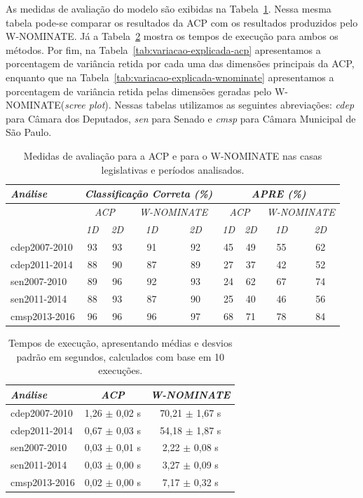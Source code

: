 \documentclass[
	article,			%
	12pt,				%
    twoside,			%
	a4paper,			%
	english,			%
	french,				%
	spanish,			%
	brazil,				%
	]{abntex2}
\newcommand\wnominate{W-NOMINATE\xspace}
\begin{document}
As medidas de avaliação do modelo são exibidas na Tabela~\ref{tab:fit}. Nessa mesma tabela pode-se comparar os resultados da ACP com os resultados produzidos pelo \wnominate. Já a Tabela~\ref{tab:tempos} mostra os tempos de execução para ambos os métodos. Por fim, na Tabela~\ref{tab:variacao-explicada-acp} apresentamos a porcentagem de variância retida por cada uma das dimensões principais da ACP, enquanto que na Tabela~\ref{tab:variacao-explicada-wnominate} apresentamos a porcentagem de variância retida pelas dimensões geradas pelo \wnominate (\emph{scree plot}). Nessas tabelas utilizamos as seguintes abreviações: \emph{cdep} para Câmara dos Deputados, \emph{sen} para Senado e \emph{cmsp} para Câmara Municipal de São Paulo.

\begin{table}
\centering
\begin{tabular}{l | c c | c c | c c | c c} 
\itshape Análise & \multicolumn{4}{c|}{\itshape Classificação Correta (\%)} & \multicolumn{4}{|c}{\itshape APRE (\%)} \\ 
\hline 
& \multicolumn{2}{c|}{\itshape ACP} & \multicolumn{2}{|c|}{\itshape \wnominate} & \multicolumn{2}{|c|}{\itshape ACP} & \multicolumn{2}{c}{\itshape \wnominate} \\ 
\hline 
& \itshape 1D & \itshape 2D & \itshape 1D & \itshape 2D & \itshape 1D & \itshape 2D & \itshape 1D & \itshape 2D \\ 
\hline 
cdep2007-2010 & 93 & 93 & 91 & 92 & 45 & 49 & 55 & 62 \\ 
cdep2011-2014 & 88 & 90 & 87 & 89 & 27 & 37 & 42 & 52 \\ 
sen2007-2010  & 89 & 96 & 92 & 93 & 24 & 62 & 67 & 74 \\ 
sen2011-2014  & 88 & 93 & 87 & 90 & 25 & 40 & 46 & 56 \\ 
cmsp2013-2016 & 96 & 96 & 96 & 97 & 68 & 71 & 78 & 84 \\ 
\end{tabular} 
\caption{Medidas de avaliação para a ACP e para o \wnominate nas casas legislativas e períodos analisados.}
\label{tab:fit}
\end{table}

\begin{table}
\centering
\begin{tabular}{l c c}
\itshape Análise & \itshape ACP & \itshape \wnominate \\
\hline
cdep2007-2010 & 1,26 $\pm$ 0,02 s & 70,21 $\pm$ 1,67 s \\ 
cdep2011-2014 & 0,67 $\pm$ 0,03 s & 54,18 $\pm$ 1,87 s \\ 
sen2007-2010  & 0,03 $\pm$ 0,01 s & 2,22 $\pm$ 0,08 s  \\ 
sen2011-2014  & 0,03 $\pm$ 0,00 s & 3,27 $\pm$ 0,09 s  \\ 
cmsp2013-2016 & 0,02 $\pm$ 0,00 s & 7,17 $\pm$ 0,32 s  \\ 
\end{tabular} 
\caption{Tempos de execução, apresentando médias e desvios padrão em segundos, calculados com base em 10 execuções.}
\label{tab:tempos}
\end{table}
\end{document}
